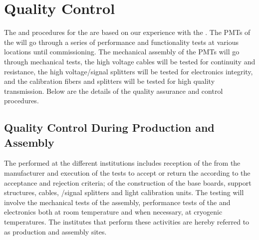 \section{Quality Control}
\label{sec:dp-pds-quality}

The  and  procedures for the \dual {} are based on our experience with the . The PMTs of the \dual {} will go through a series of performance and functionality tests at various locations until commissioning. The mechanical assembly of the PMTs will go through mechanical tests, the high voltage cables will be tested for continuity and resistance, the high voltage/signal splitters will be tested for electronics integrity, and the calibration fibers and splitters will be tested for high quality transmission. Below  are the details of the quality assurance and control procedures.

\subsection{Quality Control During Production and Assembly}

The  performed at the different institutions includes reception of the  from the manufacturer and execution of the  tests to accept or return the  according to the acceptance and rejection criteria;  of the construction of the base boards, support structures, cables, /signal splitters and light calibration units. The testing will involve the mechanical tests of the assembly, performance tests of the  and electronics both at room temperature and when necessary, at cryogenic temperatures. The institutes that perform these activities are hereby referred to as production and assembly sites.

